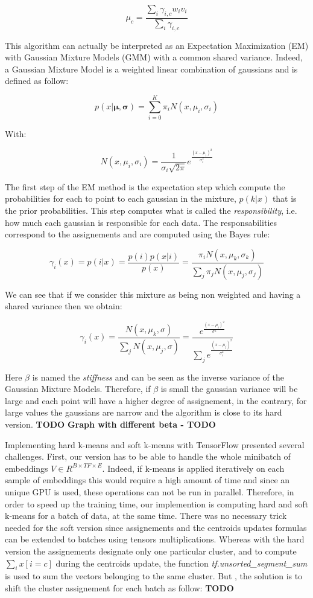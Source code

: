 \documentclass[master,final,11pt]{iscs-thesis}
\begin{document}
\[ \mu_c = \frac{\sum_i \gamma_{i,c}w_iv_i}{\sum_i \gamma_{i,c}}  \]


This algorithm can actually be interpreted as an Expectation Maximization (EM) with Gaussian Mixture Models (GMM) with a common shared variance. Indeed, a Gaussian Mixture Model is a weighted linear combination of gaussians and is defined as follow:

\[
 p(x | \mathbf{\mu}, \mathbf{\sigma}) = \sum_{i=0}^K \pi_i N(x, \mu_i,\sigma_i)
\]

With:

\[
N(x, \mu_i,\sigma_i) = \frac{1}{\sigma_i \sqrt{2\pi}} e^{\frac{(x-\mu_i)^2}{\sigma_i^2}}
\]

The first step of the EM method is the expectation step which compute the probabilities for each to point to each gaussian in the mixture, $p(k|x)$ that is the prior probabilities. This step computes what is called the \textit{responsibility}, i.e. how much each gaussian is responsible for each data. The responsabilities correspond to the assignements and are computed using the Bayes rule:

\[
\gamma_i(x) = p(i|x) = \frac{p(i)p(x|i)}{p(x)} = \frac{\pi_i N(x, \mu_k,\sigma_k)}{\sum_j \pi_j N(x, \mu_j,\sigma_j)}
\]

We can see that if we consider this mixture as being non weighted and having a shared variance then we obtain:

\[
\gamma_i(x) = \frac{N(x, \mu_k,\sigma)}{\sum_j N(x, \mu_j,\sigma)} = \frac{e^{\frac{(x-\mu_i)^2}{\sigma^2}}}{\sum_j e^{\frac{(x-\mu_j)^2}{\sigma_i^2}}} 
\]



Here $\beta$ is named the \textit{stiffness} and can be seen as the inverse variance of the Gaussian Mixture Models. Therefore, if $\beta$ is small the gaussian variance will be large and each point will have a higher degree of assignement, in the contrary, for large values the gaussians are narrow and the algorithm is close to its hard version.
\textbf{TODO}
\textbf{Graph with different beta - TODO}

Implementing hard k-means and soft k-means with TensorFlow presented several challenges. First, our version has to be able to handle the whole minibatch of embeddings $V\in R^{B\times TF \times E}$. Indeed, if k-means is applied iteratively on each sample of embeddings this would require a high amount of time and since an unique GPU is used, these operations can not be run in parallel. Therefore, in order to speed up the training time, our implemention is computing hard and soft k-means for a batch of data, at the same time. There was no necessary trick needed for the soft version since assignements and the centroids updates formulas can be extended to batches using tensors multiplications. Whereas with the hard version the assignements designate only one particular cluster, and to compute $\sum_i x[i = c]$ during the centroids update, the function \textit{tf.unsorted\_segment\_sum} is used to sum the vectors belonging to the same cluster. But , the solution is to shift the cluster assignement for each batch as follow:
\textbf{TODO}
\end{document}
